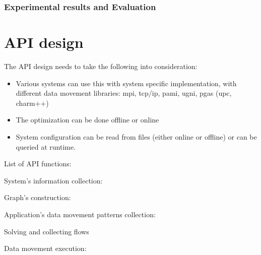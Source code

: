 \documentclass[letter]{article}
\begin{document}
\subsubsection{Experimental results and Evaluation}

\section{API design}
The API design needs to take the following into consideration:

\begin{itemize}
	\item Various systems can use this with system specific implementation, with different data movement libraries: mpi, tcp/ip, pami, ugni, pgas (upc, charm++)
	\item The optimization can be done offline or online
	\item System configuration can be read from files (either online or offline) or can be queried at runtime.
\end{itemize}

List of API functions:

System's information collection:

Graph's construction:

Application's data movement patterns collection:

Solving and collecting flows

Data movement execution:
\end{document}
